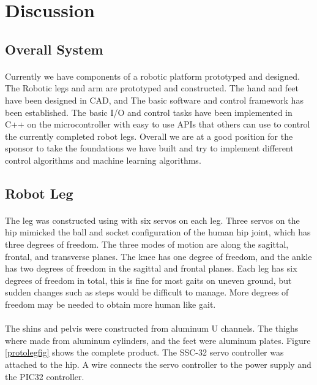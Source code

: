 \documentclass[titlepage,letterpaper,12pt]{article}
\begin{document}
\section{Discussion}
\subsection{Overall System}
\paragraph{}Currently we have components of a robotic platform prototyped and
designed. The Robotic legs and arm are prototyped and constructed. The hand and
feet have been designed in CAD, and The basic software and control framework has
been established. The basic I/O and control tasks have been implemented in C++
on the microcontroller with easy to use APIs that others can use to control the
currently completed robot legs. Overall we are at a good position for the
sponsor to take the foundations we have built and try to implement different
control algorithms and machine learning algorithms. 

\subsection{Robot Leg}
\paragraph{}The leg was constructed using with six servos on each leg. Three
servos on the hip mimicked the ball and socket configuration of the human hip
joint, which has three degrees of freedom\cite{SiasJr1990}. The three modes of
motion are along the sagittal, frontal, and transverse planes\cite{Fiscell2005}.
The knee has one degree of freedom, and the ankle has two degrees of freedom in
the sagittal and frontal planes. Each leg has six degrees of freedom in total,
this is fine for most gaits on uneven ground, but sudden changes such as steps
would be difficult to manage\cite{SiasJr1990}. More degrees of freedom may be
needed to obtain more human like gait\cite{SiasJr1990}.

\paragraph{}The shins and pelvis were constructed from aluminum U channels. The
thighs where made from aluminum cylinders, and the feet were aluminum plates.
Figure \ref{protolegfig} shows the complete product. The SSC-32 servo controller
was attached to the hip. A wire connects the servo controller to the power
supply and the PIC32 controller. 
\end{document}
